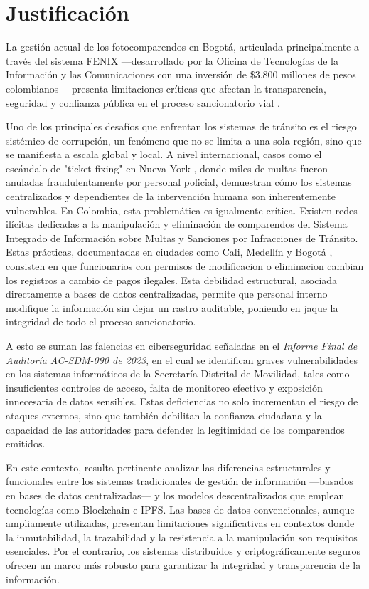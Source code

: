 \section{\large Justificación}

La gestión actual de los fotocomparendos en Bogotá, articulada principalmente a través del sistema FENIX —desarrollado por la Oficina de Tecnologías de la Información y las Comunicaciones con una inversión de \$3.800 millones de pesos colombianos— presenta limitaciones críticas que afectan la transparencia, seguridad y confianza pública en el proceso sancionatorio vial \parencite{resolucionFenix}.

Uno de los principales desafíos que enfrentan los sistemas de tránsito es el riesgo sistémico de corrupción, un fenómeno que no se limita a una sola región, sino que se manifiesta a escala global y local. A nivel internacional, casos como el escándalo de "ticket-fixing" en Nueva York \parencite{barbaro2011ticketfixing}, donde miles de multas fueron anuladas fraudulentamente por personal policial, demuestran cómo los sistemas centralizados y dependientes de la intervención humana son inherentemente vulnerables. En Colombia, esta problemática es igualmente crítica. Existen redes ilícitas dedicadas a la manipulación y eliminación de comparendos del Sistema Integrado de Información sobre Multas y Sanciones por Infracciones de Tránsito. Estas prácticas, documentadas en ciudades como Cali, Medellín y Bogotá  \parencite{blogAletta,procuraduriaBucaramanga} , consisten en que funcionarios con permisos de modificacion o eliminacion cambian los registros a cambio de pagos ilegales. Esta debilidad estructural, asociada directamente a bases de datos centralizadas, permite que personal interno modifique la información sin dejar un rastro auditable, poniendo en jaque la integridad de todo el proceso sancionatorio.

A esto se suman las falencias en ciberseguridad señaladas en el \textit{Informe Final de Auditoría AC-SDM-090 de 2023}, en el cual se identifican graves vulnerabilidades en los sistemas informáticos de la Secretaría Distrital de Movilidad, tales como insuficientes controles de acceso, falta de monitoreo efectivo y exposición innecesaria de datos sensibles\parencite{auditoriaSDM}. Estas deficiencias no solo incrementan el riesgo de ataques externos, sino que también debilitan la confianza ciudadana y la capacidad de las autoridades para defender la legitimidad de los comparendos emitidos.

En este contexto, resulta pertinente analizar las diferencias estructurales y funcionales entre los sistemas tradicionales de gestión de información —basados en bases de datos centralizadas— y los modelos descentralizados que emplean tecnologías como Blockchain e IPFS. Las bases de datos convencionales, aunque ampliamente utilizadas, presentan limitaciones significativas en contextos donde la inmutabilidad, la trazabilidad y la resistencia a la manipulación son requisitos esenciales. Por el contrario, los sistemas distribuidos y criptográficamente seguros ofrecen un marco más robusto para garantizar la integridad y transparencia de la información.

